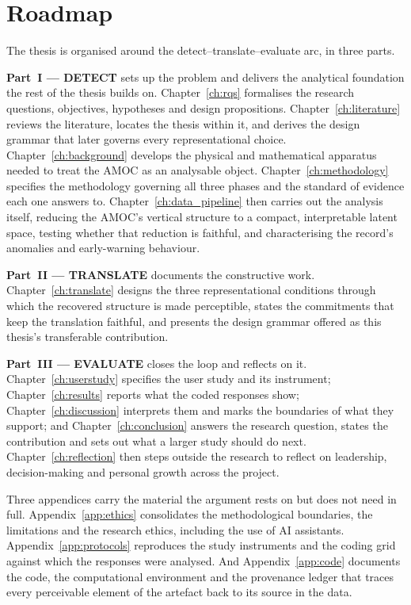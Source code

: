 

\section{Roadmap}
\label{sec:roadmap}

The thesis is organised around the detect--translate--evaluate arc, in three parts.

\textbf{Part~I --- DETECT} sets up the problem and delivers the analytical foundation the rest of the thesis builds on. Chapter~\ref{ch:rqs} formalises the research questions, objectives, hypotheses and design propositions. Chapter~\ref{ch:literature} reviews the literature, locates the thesis within it, and derives the design grammar that later governs every representational choice. Chapter~\ref{ch:background} develops the physical and mathematical apparatus needed to treat the AMOC as an analysable object. Chapter~\ref{ch:methodology} specifies the methodology governing all three phases and the standard of evidence each one answers to. Chapter~\ref{ch:data_pipeline} then carries out the analysis itself, reducing the AMOC's vertical structure to a compact, interpretable latent space, testing whether that reduction is faithful, and characterising the record's anomalies and early-warning behaviour.

\textbf{Part~II --- TRANSLATE} documents the constructive work. Chapter~\ref{ch:translate} designs the three representational conditions through which the recovered structure is made perceptible, states the commitments that keep the translation faithful, and presents the design grammar offered as this thesis's transferable contribution.

\textbf{Part~III --- EVALUATE} closes the loop and reflects on it. Chapter~\ref{ch:userstudy} specifies the user study and its instrument; Chapter~\ref{ch:results} reports what the coded responses show; Chapter~\ref{ch:discussion} interprets them and marks the boundaries of what they support; and Chapter~\ref{ch:conclusion} answers the research question, states the contribution and sets out what a larger study should do next. Chapter~\ref{ch:reflection} then steps outside the research to reflect on leadership, decision-making and personal growth across the project.

Three appendices carry the material the argument rests on but does not need in full. Appendix~\ref{app:ethics} consolidates the methodological boundaries, the limitations and the research ethics, including the use of AI assistants. Appendix~\ref{app:protocols} reproduces the study instruments and the coding grid against which the responses were analysed. And Appendix~\ref{app:code} documents the code, the computational environment and the provenance ledger that traces every perceivable element of the artefact back to its source in the data.
